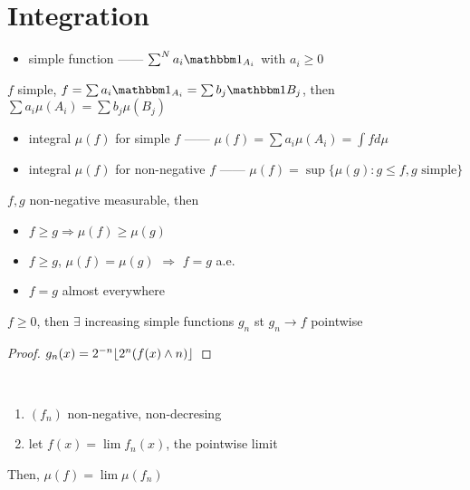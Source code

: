 \section{Integration}\label{sec:integration}

\begin{itemize}
    \item simple function ------ $\sum^N a_i \In_{A_{i}}$ with $a_i \geq 0$
\end{itemize}

\begin{lemma}
   $f$ simple, $f = \sum a_i\In_{A_i} = \sum b_j \In{B_j}$, then $\sum a_i \mu(A_i) = \sum b_j \mu(B_j)$
\end{lemma}

\begin{itemize}
    \item integral $\mu(f)$ for simple $f$ ------ $\mu(f) = \sum a_i \mu(A_i) = \int f d\mu$
    \item integral $\mu(f)$ for non-negative $f$ ------ $\mu(f) = \sup \{\mu(g) : g \leq f, g \text{ simple}\}$
\end{itemize}

\begin{prop}[positivity]
    $f, g$ non-negative measurable, then
    \begin{itemize}
        \item $f \geq g \Rightarrow \mu(f) \geq \mu(g)$
        \item $f \geq g$, $\mu(f) = \mu(g)$ $\Rightarrow$ $f = g$ a.e.
    \end{itemize}
\end{prop}

\begin{itemize}
    \item $f = g$ almost everywhere
\end{itemize}

\begin{lemma}
    $f \geq 0$, then $\exists$ increasing simple functions $g_n$ st $g_n \rightarrow f$ pointwise 
\end{lemma}

\begin{proof}
    $g_n(x) = 2^{-n}\lfloor2^n(f(x) \wedge n)\rfloor$
\end{proof}

\begin{thm}\,
    \begin{enumerate}
        \item $(f_n)$ non-negative, non-decresing
        \item let $f(x) = \lim f_n(x)$, the pointwise limit
    \end{enumerate}
    Then, $\mu(f) = \lim \mu(f_n)$
\end{thm}


